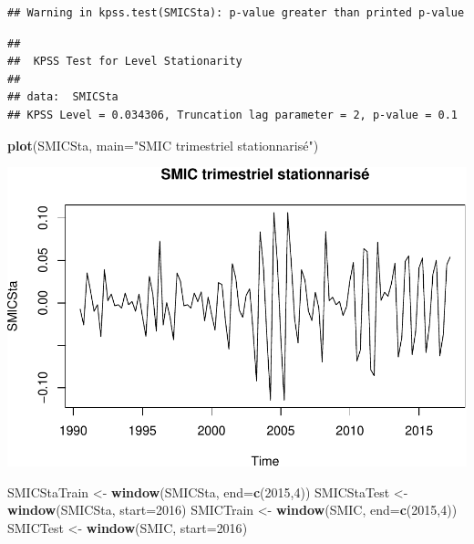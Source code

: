 \documentclass[11pt,]{article}
\newenvironment{Shaded}{\begin{snugshade}}{\end{snugshade}}
\newcommand{\KeywordTok}[1]{\textcolor[rgb]{0.13,0.29,0.53}{\textbf{{#1}}}}
\newcommand{\DataTypeTok}[1]{\textcolor[rgb]{0.13,0.29,0.53}{{#1}}}
\newcommand{\DecValTok}[1]{\textcolor[rgb]{0.00,0.00,0.81}{{#1}}}
\newcommand{\StringTok}[1]{\textcolor[rgb]{0.31,0.60,0.02}{{#1}}}
\newcommand{\NormalTok}[1]{{#1}}
\begin{document}
\begin{verbatim}
## Warning in kpss.test(SMICSta): p-value greater than printed p-value
\end{verbatim}

\begin{verbatim}
## 
##  KPSS Test for Level Stationarity
## 
## data:  SMICSta
## KPSS Level = 0.034306, Truncation lag parameter = 2, p-value = 0.1
\end{verbatim}

\begin{Shaded}
\begin{Highlighting}[]
  \KeywordTok{plot}\NormalTok{(SMICSta, }\DataTypeTok{main=}\StringTok{"SMIC trimestriel stationnarisé"}\NormalTok{)}
\end{Highlighting}
\end{Shaded}

\includegraphics{doc_files/figure-latex/unnamed-chunk-8-2.pdf}

\begin{Shaded}
\begin{Highlighting}[]
  \NormalTok{SMICStaTrain <-}\StringTok{ }\KeywordTok{window}\NormalTok{(SMICSta, }\DataTypeTok{end=}\KeywordTok{c}\NormalTok{(}\DecValTok{2015}\NormalTok{,}\DecValTok{4}\NormalTok{))}
  \NormalTok{SMICStaTest <-}\StringTok{ }\KeywordTok{window}\NormalTok{(SMICSta, }\DataTypeTok{start=}\DecValTok{2016}\NormalTok{)}
  \NormalTok{SMICTrain <-}\StringTok{ }\KeywordTok{window}\NormalTok{(SMIC, }\DataTypeTok{end=}\KeywordTok{c}\NormalTok{(}\DecValTok{2015}\NormalTok{,}\DecValTok{4}\NormalTok{))}
  \NormalTok{SMICTest <-}\StringTok{ }\KeywordTok{window}\NormalTok{(SMIC, }\DataTypeTok{start=}\DecValTok{2016}\NormalTok{)}
\end{Highlighting}
\end{Shaded}
\end{document}
